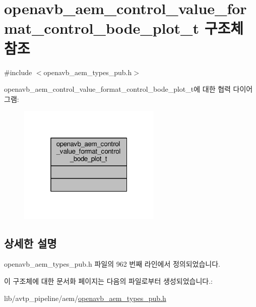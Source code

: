 \hypertarget{structopenavb__aem__control__value__format__control__bode__plot__t}{}\section{openavb\+\_\+aem\+\_\+control\+\_\+value\+\_\+format\+\_\+control\+\_\+bode\+\_\+plot\+\_\+t 구조체 참조}
\label{structopenavb__aem__control__value__format__control__bode__plot__t}


{\ttfamily \#include $<$openavb\+\_\+aem\+\_\+types\+\_\+pub.\+h$>$}



openavb\+\_\+aem\+\_\+control\+\_\+value\+\_\+format\+\_\+control\+\_\+bode\+\_\+plot\+\_\+t에 대한 협력 다이어그램\+:
\nopagebreak
\begin{figure}[H]
\begin{center}
\leavevmode
\includegraphics[width=193pt]{structopenavb__aem__control__value__format__control__bode__plot__t__coll__graph}
\end{center}
\end{figure}


\subsection{상세한 설명}


openavb\+\_\+aem\+\_\+types\+\_\+pub.\+h 파일의 962 번째 라인에서 정의되었습니다.



이 구조체에 대한 문서화 페이지는 다음의 파일로부터 생성되었습니다.\+:\begin{DoxyCompactItemize}
\item 
lib/avtp\+\_\+pipeline/aem/\hyperlink{openavb__aem__types__pub_8h}{openavb\+\_\+aem\+\_\+types\+\_\+pub.\+h}\end{DoxyCompactItemize}
